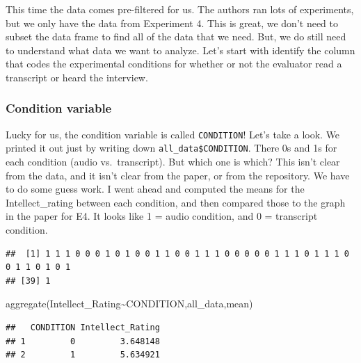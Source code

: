 \documentclass[
]{book}
\newenvironment{Shaded}{\begin{snugshade}}{\end{snugshade}}
\newcommand{\FunctionTok}[1]{\textcolor[rgb]{0.00,0.00,0.00}{#1}}
\newcommand{\NormalTok}[1]{#1}
\newcommand{\SpecialCharTok}[1]{\textcolor[rgb]{0.00,0.00,0.00}{#1}}
\begin{document}
This time the data comes pre-filtered for us. The authors ran lots of experiments, but we only have the data from Experiment 4. This is great, we don't need to subset the data frame to find all of the data that we need. But, we do still need to understand what data we want to analyze. Let's start with identify the column that codes the experimental conditions for whether or not the evaluator read a transcript or heard the interview.

\hypertarget{condition-variable}{%
\subsubsection{Condition variable}\label{condition-variable}}

Lucky for us, the condition variable is called \texttt{CONDITION}! Let's take a look. We printed it out just by writing down \texttt{all\_data\$CONDITION}. There 0s and 1s for each condition (audio vs.~transcript). But which one is which? This isn't clear from the data, and it isn't clear from the paper, or from the repository. We have to do some guess work. I went ahead and computed the means for the Intellect\_rating between each condition, and then compared those to the graph in the paper for E4. It looks like 1 = audio condition, and 0 = transcript condition.

\begin{Shaded}
\end{Shaded}

\begin{verbatim}
##  [1] 1 1 1 0 0 0 1 0 1 0 0 1 1 0 0 1 1 1 0 0 0 0 0 1 1 1 0 1 1 1 0 0 1 1 0 1 0 1
## [39] 1
\end{verbatim}

\begin{Shaded}
\begin{Highlighting}[]
\FunctionTok{aggregate}\NormalTok{(Intellect\_Rating}\SpecialCharTok{\textasciitilde{}}\NormalTok{CONDITION,all\_data,mean)}
\end{Highlighting}
\end{Shaded}

\begin{verbatim}
##   CONDITION Intellect_Rating
## 1         0         3.648148
## 2         1         5.634921
\end{verbatim}
\end{document}
